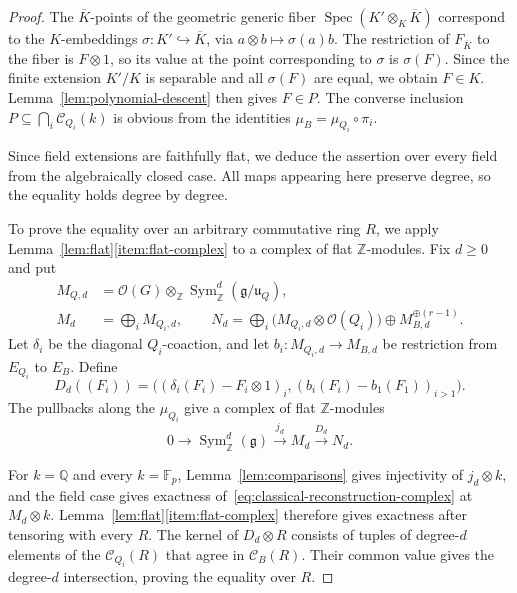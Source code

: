 \documentclass[twoside,a4paper,12pt,reqno]{amsart}
\theoremstyle{remark}
\numberwithin{equation}{section}
\newcommand{\Z}{\mathbb Z}
\newcommand{\Q}{\mathbb Q}
\newcommand{\F}{\mathbb F}
\newcommand{\cO}{\mathcal O}
\newcommand{\fg}{\mathfrak g}
\newcommand{\fu}{\mathfrak u}
\DeclareMathOperator{\Sym}{Sym}
\DeclareMathOperator{\Spec}{Spec}
\begin{document}
\begin{proof}
The \(\overline K\)-points of the geometric generic fiber
\(\Spec(K'\otimes_K\overline K)\) correspond to the \(K\)-embeddings
\(\sigma:K'\hookrightarrow\overline K\), via
\(a\otimes b\mapsto\sigma(a)b\).
The restriction of \(F_{\overline K}\) to the fiber is \(F\otimes1\),
so its value at the point corresponding to \(\sigma\) is \(\sigma(F)\).
Since the finite extension \(K'/K\) is separable and all
\(\sigma(F)\) are equal, we obtain \(F\in K\).
Lemma~\ref{lem:polynomial-descent} then gives \(F\in P\).
The converse inclusion \(P\subseteq\bigcap_i\mathcal C_{Q_i}(k)\)
is obvious from the identities \(\mu_B=\mu_{Q_i}\circ\pi_i\).

Since field extensions are faithfully flat, we deduce the assertion over every field from
the algebraically closed case. All maps appearing here preserve degree, so the equality
holds degree by degree.

To prove the equality over an arbitrary commutative ring \(R\),
we apply Lemma~\ref{lem:flat}\eqref{item:flat-complex} to a
complex of flat \(\Z\)-modules.
Fix \(d\ge0\) and put
\[
\begin{aligned}
M_{Q,d}&=\cO(G)\otimes_{\Z}\Sym_{\Z}^d(\fg/\fu_Q),\\
M_d&=\bigoplus_i M_{Q_i,d},\qquad
N_d=\bigoplus_i\bigl(M_{Q_i,d}\otimes\cO(Q_i)\bigr)
\oplus M_{B,d}^{\oplus(r-1)}.
\end{aligned}
\]
Let \(\delta_i\) be the diagonal \(Q_i\)-coaction, and let
\(b_i:M_{Q_i,d}\to M_{B,d}\) be restriction from \(E_{Q_i}\) to \(E_B\).
Define
\[
D_d((F_i))=\bigl((\delta_i(F_i)-F_i\otimes1)_i,
(b_i(F_i)-b_1(F_1))_{i>1}\bigr).
\]
The pullbacks along the \(\mu_{Q_i}\) give a complex of flat \(\Z\)-modules
\begin{equation}\label{eq:classical-reconstruction-complex}
0\longrightarrow\Sym_{\Z}^d(\fg)
\xrightarrow{j_d}M_d\xrightarrow{D_d}N_d.
\end{equation}

For \(k=\Q\) and every \(k=\F_p\),
Lemma~\ref{lem:comparisons} gives injectivity of \(j_d\otimes k\),
and the field case gives exactness of~\eqref{eq:classical-reconstruction-complex}
at \(M_d\otimes k\).
Lemma~\ref{lem:flat}\eqref{item:flat-complex} therefore gives exactness
after tensoring with every \(R\).
The kernel of \(D_d\otimes R\) consists of tuples of degree-\(d\)
elements of the \(\mathcal C_{Q_i}(R)\) that agree in \(\mathcal C_B(R)\).
Their common value gives the degree-\(d\) intersection, proving the
equality over \(R\).
\end{proof}
\end{document}
